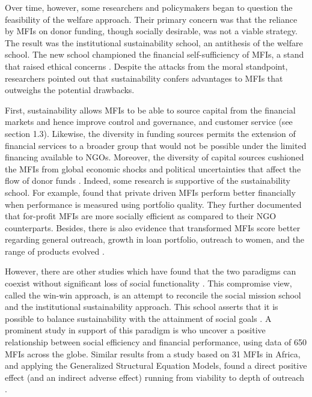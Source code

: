 \documentclass[a4paper, nobind]{templates/ociamthesis}
\begin{document}
Over time, however, some researchers and policymakers began to question the feasibility of the welfare approach. Their primary concern was that the reliance by MFIs on donor funding, though socially desirable, was not a viable strategy. The result was the institutional sustainability school, an antithesis of the welfare school. The new school championed the financial self-sufficiency of MFIs, a stand that raised ethical concerns \autocite{mersland2010microfinance}. Despite the attacks from the moral standpoint, researchers pointed out that sustainability confers advantages to MFIs that outweighs the potential drawbacks.

First, sustainability allows MFIs to be able to source capital from the financial markets and hence improve control and governance, and customer service (see section 1.3). Likewise, the diversity in funding sources permits the extension of financial services to a broader group that would not be possible under the limited financing available to NGOs. Moreover, the diversity of capital sources cushioned the MFIs from global economic shocks and political uncertainties that affect the flow of donor funds \autocite{garmaise2013cheap,d2017ngos}. Indeed, some research is supportive of the sustainability school. For example, \textcite{tchakoute2010there} found that private driven MFIs perform better financially when performance is measured using portfolio quality. They further documented that for-profit MFIs are more socially efficient as compared to their NGO counterparts. Besides, there is also evidence that transformed MFIs score better regarding general outreach, growth in loan portfolio, outreach to women, and the range of products evolved \autocite{frank2008stemming}.

However, there are other studies which have found that the two paradigms can coexist without significant loss of social functionality \autocite{2012009performance,mersland2010microfinance}. This compromise view, called the win-win approach, is an attempt to reconcile the social mission school and the institutional sustainability approach. This school asserts that it is possible to balance sustainability with the attainment of social goals \autocite{kodongo2013individual}. A prominent study in support of this paradigm is \autocite{louis2013financial} who uncover a positive relationship between social efficiency and financial performance, using data of 650 MFIs across the globe. Similar results from a study based on 31 MFIs in Africa, and applying the Generalized Structural Equation Models, found a direct positive effect (and an indirect adverse effect) running from viability to depth of outreach \autocite{ayele2015microfinance}.
\end{document}
